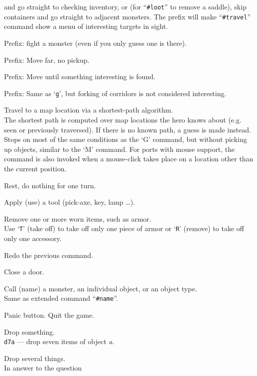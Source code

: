 and go straight to checking inventory,
or (for ``{\tt \#loot}'' to remove a saddle),
skip containers and go straight to adjacent monsters. The prefix will
make ``{\tt \#travel}'' command show a menu of interesting targets in sight.
\item[\tb{F[yuhjklbn]}]
Prefix:  fight a monster (even if you only guess one is there).
\item[\tb{M[yuhjklbn]}]
Prefix:  Move far, no pickup.
\item[\tb{g[yuhjklbn]}]
Prefix:  Move until something interesting is found.
\item[\tb{G[yuhjklbn] {\rm or} <CONTROL->[yuhjklbn]}]
Prefix:  Same as `{\tt g}', but forking of corridors is not considered
interesting.
\item[\tb{_}]
Travel to a map location via a shortest-path algorithm.\\
The shortest path
is computed over map locations the hero knows about (e.g. seen or
previously traversed).  If there is no known path, a guess is made instead.
Stops on most of 
the same conditions as the `G' command, but without picking up
objects, similar to the `M' command.  For ports with mouse 
support, the command is also invoked when a mouse-click takes place on a 
location other than the current position.
\item[\tb{.}]
Rest, do nothing for one turn.
\item[\tb{a}]
Apply (use) a tool (pick-axe, key, lamp \ldots).
\item[\tb{A}]
Remove one or more worn items, such as armor.\\
Use `{\tt T}' (take off) to take off only one piece of armor 
or `{\tt R}' (remove) to take off only one accessory.
\item[\tb{\^{}A}]
Redo the previous command.
\item[\tb{c}]
Close a door.
\item[\tb{C}]
Call (name) a monster, an individual object, or an object type.\\
Same as extended command ``{\tt \#name}''.
\item[\tb{\^{}C}]
Panic button.  Quit the game.
\item[\tb{d}]
Drop something.\\
{\tt d7a} --- drop seven items of object
{\it a}.
\item[\tb{D}]
Drop several things.\\
In answer to the question\\
